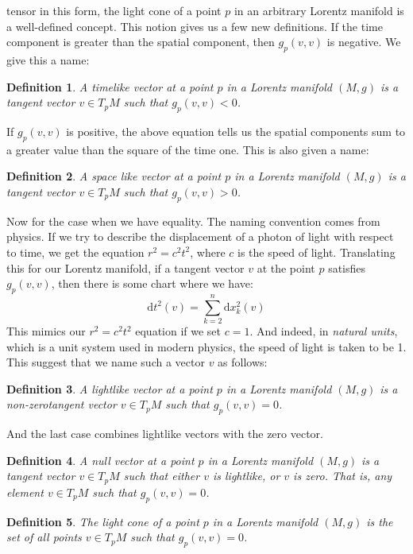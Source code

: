 \documentclass{article}
\theoremstyle{plain}
\theoremstyle{thmit}
\theoremstyle{normal}
\newtheorem{definition}{Definition}[section]
\begin{document}
        tensor in this form, the light cone of a point $p$ in an arbitrary
        Lorentz manifold is a well-defined concept. This notion gives us a few
        new definitions. If the time component is greater than the spatial
        component, then $g_{p}(v,v)$ is negative. We give this a name:
        \begin{definition}
            A timelike vector at a point $p$ in a Lorentz manifold $(M,g)$ is a
            tangent vector $v\in{T}_{p}M$ such that $g_{p}(v,v)<0$.
        \end{definition}
        If $g_{p}(v,v)$ is positive, the above equation tells us the spatial
        components sum to a greater value than the square of the time one. This
        is also given a name:
        \begin{definition}
            A space like vector at a point $p$ in a Lorentz manifold $(M,g)$ is
            a tangent vector $v\in{T}_{p}M$ such that $g_{p}(v,v)>0$.
        \end{definition}
        Now for the case when we have equality. The naming convention comes from
        physics. If we try to describe the displacement of a photon of light
        with respect to time, we get the equation $r^{2}=c^{2}t^{2}$, where
        $c$ is the speed of light. Translating this for our Lorentz manifold,
        if a tangent vector $v$ at the point $p$ satisfies
        $g_{p}(v,v)$, then there is some chart where we have:
        \begin{equation}
            \textrm{d}t^{2}(v)=\sum_{k=2}^{n}\textrm{d}x_{k}^{2}(v)
        \end{equation}
        This mimics our $r^{2}=c^{2}t^{2}$ equation if we set $c=1$. And indeed,
        in \textit{natural units}, which is a unit system used in modern
        physics, the speed of light is taken to be 1. This suggest that we name
        such a vector $v$ as follows:
        \begin{definition}
            A lightlike vector at a point $p$ in a Lorentz manifold $(M,g)$ is a
            non-zerotangent vector $v\in{T}_{p}M$ such that $g_{p}(v,v)=0$.
        \end{definition}
        And the last case combines lightlike vectors with the zero vector.
        \begin{definition}
            A null vector at a point $p$ in a Lorentz manifold $(M,g)$ is a
            tangent vector $v\in{T}_{p}M$ such that either $v$ is lightlike, or
            $v$ is zero. That is, any element $v\in{T}_{p}M$ such that
            $g_{p}(v,v)=0$.
        \end{definition}
        \begin{definition}
            The light cone of a point $p$ in a Lorentz manifold $(M,g)$ is the
            set of all points $v\in{T}_{p}M$ such that $g_{p}(v,v)=0$.
        \end{definition}
\end{document}
